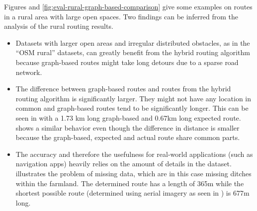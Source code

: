 			\noindent
			Figures  and \ref{fig:eval-rural-graph-based-comparison} give some examples on routes in a rural area with large open spaces.
			Two findings can be inferred from the analysis of the rural routing results.
			
			\begin{itemize}
				\item Datasets with larger open areas and irregular distributed obstacles, as in the \enquote{OSM rural} datasets, can greatly benefit from the hybrid routing algorithm because graph-based routes might take long detours due to a sparse road network.
				\item The difference between graph-based routes and routes from the hybrid routing algorithm is significantly larger.
				They might not have any location in common and graph-based routes tend to be significantly longer.
				This can be seen in  with a 1.73 km long graph-based and 0.67km long expected route.
				 shows a similar behavior even though the difference in distance is smaller because the graph-based, expected and actual route share common parts.
				\item The accuracy and therefore the usefulness for real-world applications (such as navigation apps) heavily relies on the amount of details in the dataset.
				 illustrates the problem of missing data, which are in this case missing ditches within the farmland.
				The determined route has a length of 365m while the shortest possible route (determined using aerial imagery as seen in ) is 677m long.
			\end{itemize}
			
